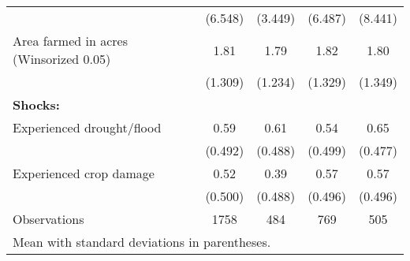 {\begin{tabular}{l*{4}{c}}
                    &     (6.548)         &     (3.449)         &     (6.487)         &     (8.441)         \\
[1em]
Area farmed in acres (Winsorized 0.05)&        1.81         &        1.79         &        1.82         &        1.80         \\
                    &     (1.309)         &     (1.234)         &     (1.329)         &     (1.349)         \\
[1em]
\textbf{Shocks:}    &                     &                     &                     &                     \\
[1em]
Experienced drought/flood&        0.59         &        0.61         &        0.54         &        0.65         \\
                    &     (0.492)         &     (0.488)         &     (0.499)         &     (0.477)         \\
[1em]
Experienced crop damage&        0.52         &        0.39         &        0.57         &        0.57         \\
                    &     (0.500)         &     (0.488)         &     (0.496)         &     (0.496)         \\
\hline
Observations        &        1758         &         484         &         769         &         505         \\
\hline\hline
\multicolumn{5}{l}{\footnotesize Mean with standard deviations in parentheses.}\\
\end{tabular}
}
